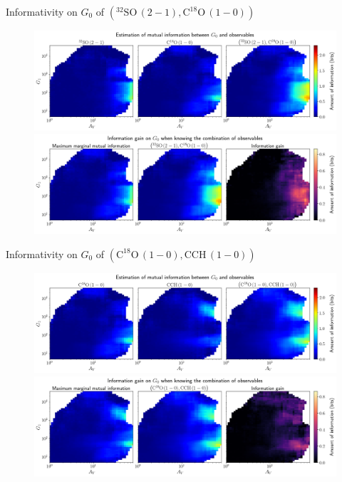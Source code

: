 \documentclass{beamer}
\begin{document}
\begin{frame}{Informativity on $G_0$ of $\left(\mathrm{^{32}SO\,(2-1)},\mathrm{C^{18}O\,(1-0)}\right)$}
    \begin{figure}
        \centering
        \includegraphics[width=0.95\linewidth]{../mi/g0__32so21_c18o10_mi.png}
        \vfill
        \includegraphics[width=0.95\linewidth]{../mi/g0__32so21_c18o10_mi_gain.png}
    \end{figure}
\end{frame}

\begin{frame}{Informativity on $G_0$ of $\left(\mathrm{C^{18}O\,(1-0)},\mathrm{CCH\,(1-0)}\right)$}
    \begin{figure}
        \centering
        \includegraphics[width=0.95\linewidth]{../mi/g0__c18o10_cch10_mi.png}
        \vfill
        \includegraphics[width=0.95\linewidth]{../mi/g0__c18o10_cch10_mi_gain.png}
    \end{figure}
\end{frame}
\end{document}
